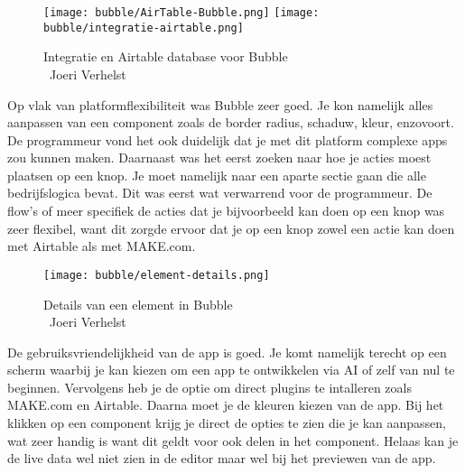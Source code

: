 \begin{figure}[H]
    \texttt{[image: bubble/AirTable-Bubble.png]}
    \texttt{[image: bubble/integratie-airtable.png]}
    \caption[Integratie en Airtable database voor Bubble]{Integratie en Airtable database voor Bubble\\\textcopyright\ Joeri Verhelst}
    \label{fig:airtable-bubble}
\end{figure}
Op vlak van platformflexibiliteit was Bubble zeer goed. Je kon namelijk alles aanpassen van een component zoals de border radius, schaduw, kleur, enzovoort. 
De programmeur vond het ook duidelijk dat je met dit platform complexe apps zou kunnen maken. Daarnaast was het eerst zoeken naar hoe je acties moest plaatsen op een knop.
Je moet namelijk naar een aparte sectie gaan die alle bedrijfslogica bevat. Dit was eerst wat verwarrend voor de programmeur. De flow's of meer specifiek de acties dat je bijvoorbeeld kan doen op een 
knop was zeer flexibel, want dit zorgde ervoor dat je op een knop zowel een actie kan doen met Airtable als met MAKE.com.
\\

\begin{figure}[H]
    \texttt{[image: bubble/element-details.png]}
    \caption[Details van een element in Bubble]{Details van een element in Bubble\\\textcopyright\ Joeri Verhelst}
    \label{fig:element-bubble}
\end{figure}
De gebruiksvriendelijkheid van de app is goed. Je komt namelijk terecht
op een scherm waarbij je kan kiezen om een app te ontwikkelen via AI of zelf van nul te beginnen. 
Vervolgens heb je de optie om direct plugins te intalleren zoals MAKE.com en Airtable. Daarna moet je de kleuren kiezen van de app.
Bij het klikken op een component krijg je direct de opties te zien die je kan aanpassen, wat zeer handig is want dit geldt voor ook delen in het component. Helaas 
kan je de live data wel niet zien in de editor maar wel bij het previewen van de app.
\\
\\
